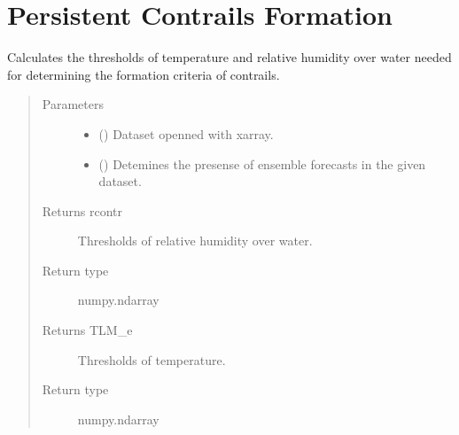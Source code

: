 \documentclass[a4paper,11pt,english]{sphinxmanual}
\begin{document}
\section{Persistent Contrails Formation}
\label{\detokenize{modules:module-envlib.contrail}}\label{\detokenize{modules:persistent-contrails-formation}}

\begin{fulllineitems}
\label{\detokenize{modules:envlib.contrail.get_cont_form_thr}}
Calculates the thresholds of temperature and relative humidity over water needed for determining the
formation criteria of contrails.
\begin{quote}\begin{description}
\item[{Parameters}] \leavevmode\begin{itemize}
\item {} 
 () \textendash{} Dataset openned with xarray.

\item {} 
 () \textendash{} Detemines the presense of ensemble forecasts in the given dataset.

\end{itemize}

\item[{Returns rcontr}] \leavevmode
Thresholds of relative humidity over water.

\item[{Return type}] \leavevmode
numpy.ndarray

\item[{Returns TLM\_e}] \leavevmode
Thresholds of temperature.

\item[{Return type}] \leavevmode
numpy.ndarray

\end{description}\end{quote}

\end{fulllineitems}
\end{document}
